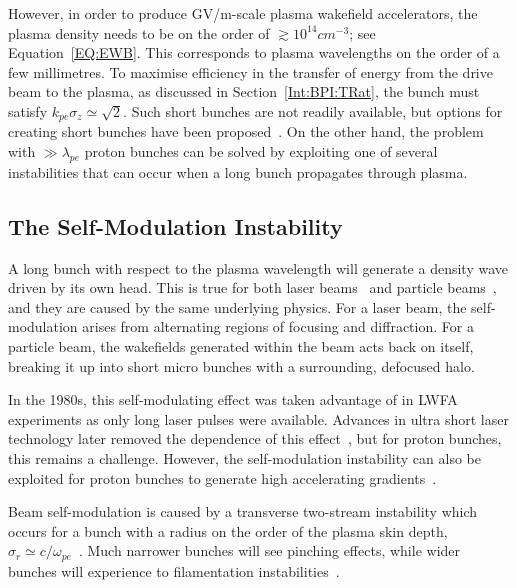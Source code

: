 However, in order to produce GV/m-scale plasma wakefield accelerators, the plasma density needs to be on the order of $\gtrsim 10^{14}\unit{cm}^{-3}$; see Equation~\ref{EQ:EWB}.
This corresponds to plasma wavelengths on the order of a few millimetres.
To maximise efficiency in the transfer of energy from the drive beam to the plasma, as discussed in Section~\ref{Int:BPI:TRat}, the bunch must satisfy $k_{pe}\sigma_{z} \simeq \sqrt{2}$.
Such short bunches are not readily available, but options for creating short bunches have been proposed~\cite{assmann:2009}.
On the other hand, the problem with $\gg\lambda_{pe}$ proton bunches can be solved by exploiting one of several instabilities that can occur when a long bunch propagates through plasma.

\subsection{The Self-Modulation Instability}
\label{Int:DBeam:SMI}

A long bunch with respect to the plasma wavelength will generate a density wave driven by its own head.
This is true for both laser beams~\cite{esarey:1994} and particle beams~\cite{kumar:2010}, and they are caused by the same underlying physics.
For a laser beam, the self-modulation arises from alternating regions of focusing and diffraction.
For a particle beam, the wakefields generated within the beam acts back on itself, breaking it up into short micro bunches with a surrounding, defocused halo.

In the 1980s, this self-modulating effect was taken advantage of in LWFA experiments as only long laser pulses were available.
Advances in ultra short laser technology later removed the dependence of this effect~\cite{pukhov:2002}, but for proton bunches, this remains a challenge.
However, the self-modulation instability can also be exploited for proton bunches to generate high accelerating gradients~\cite{schroeder:2012,schroeder:2011,caldwell:2009}.

Beam self-modulation is caused by a transverse two-stream instability which occurs for a bunch with a radius on the order of the plasma skin depth, $\sigma_{r} \simeq c/\omega_{pe}$~\cite{vieira:2012}.
Much narrower bunches will see pinching effects, while wider bunches will experience to filamentation instabilities~\cite{keinigs:1987}.


